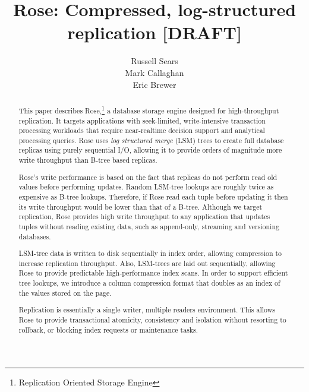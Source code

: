\documentclass{vldb}
\newcommand{\rows}{Rose\xspace}
\newcommand{\rowss}{Rose's\xspace}
\begin{document}
\title{{\ttlit \rows}: Compressed, log-structured replication [DRAFT]}
%
%
\author{
\alignauthor
Russell Sears\\
\alignauthor
Mark Callaghan\\
\alignauthor
Eric Brewer\\
}
\maketitle
\begin{abstract}
This paper describes \rows,\footnote{Replication Oriented Storage
  Engine} a database storage engine designed for high-throughput
replication.  It targets applications with seek-limited,
write-intensive transaction processing workloads that require
near-realtime decision support and analytical processing queries.
\rows uses {\em log structured merge} (LSM) trees to create full
database replicas using purely sequential I/O, allowing it to provide
orders of magnitude more write throughput than B-tree based replicas.

\rowss write performance is based on the fact that replicas do not
perform read old values before performing updates.  Random LSM-tree lookups are
roughly twice as expensive as B-tree lookups.  Therefore, if \rows
read each tuple before updating it then its write throughput would be
lower than that of a B-tree.  Although we target replication, \rows provides
high write throughput to any application that updates tuples
without reading existing data, such as append-only, streaming and
versioning databases.

LSM-tree data is written to disk sequentially in index order, allowing compression to
increase replication throughput.  Also, LSM-trees are laid out sequentially,
allowing \rows to provide predictable high-performance
index scans.  In order to support efficient tree lookups, we introduce
a column compression format that doubles as an index of
the values stored on the page.

Replication is essentially a single writer, multiple readers
environment.  This allows \rows to provide transactional atomicity,
consistency and isolation without resorting to rollback, or blocking
index requests or maintenance tasks.


\end{abstract}
\end{document}
